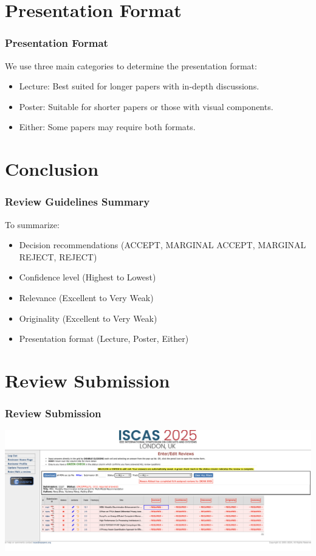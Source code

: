\documentclass{beamer}
\begin{document}
\section*{Presentation Format}
\begin{frame}
    \frametitle{Presentation Format}
    \bigskip
    We use three main categories to determine the presentation format:
    \begin{itemize}
        \item Lecture: Best suited for longer papers with in-depth discussions.
        \item Poster: Suitable for shorter papers or those with visual components.
        \item Either: Some papers may require both formats.
    \end{itemize}
\bigskip
\end{frame}

\section*{Conclusion}
\begin{frame}
    \frametitle{Review Guidelines Summary}
    \bigskip
    To summarize:
    \begin{itemize}
        \item Decision recommendations (ACCEPT, MARGINAL ACCEPT, MARGINAL REJECT, REJECT)
        \item Confidence level (Highest to Lowest)
        \item Relevance (Excellent to Very Weak)
        \item Originality (Excellent to Very Weak)
        \item Presentation format (Lecture, Poster, Either)
    \end{itemize}
\bigskip
\end{frame}

\section*{Review Submission}
\begin{frame}
  \frametitle{Review Submission}
  \bigskip
  \includegraphics[width=1.0\textwidth]{ReviewSub03.png}
  \bigskip
\end{frame}
\end{document}
